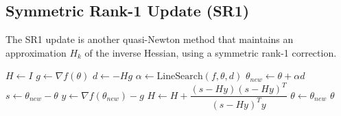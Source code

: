 \subsection{Symmetric Rank-1 Update (SR1)}

  \begin{algo}
    The SR1 update is another quasi-Newton method that maintains an approximation $H_k$ of the inverse Hessian, using a symmetric rank-1 correction. 
    \begin{algorithm}[H]
    \label{alg:sr1}
    \begin{algorithmic}[1]

        \State $H \gets I$
          \State $g \gets \nabla f(\theta)$
          \State $d \gets -H g$
          \State $\alpha \gets \text{LineSearch}(f, \theta, d)$
          \State $\theta_{new} \gets \theta + \alpha d$
          \State $s \gets \theta_{new} - \theta$
          \State $y \gets \nabla f(\theta_{new}) - g$
            \State $H \gets H + \dfrac{(s - Hy)(s - Hy)^T}{(s - Hy)^T y}$
          \EndIf
          \State $\theta \gets \theta_{new}$
        \EndWhile
        \State \Return $\theta$
      \EndProcedure
    \end{algorithmic}
    \end{algorithm}
  \end{algo}

